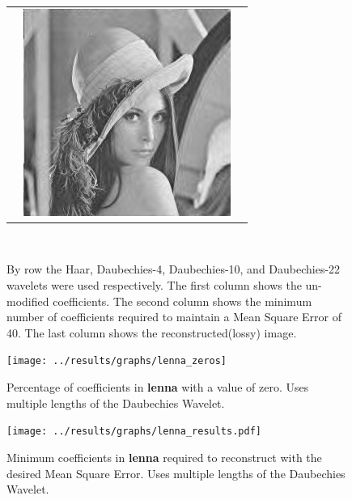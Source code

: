\begin{figure}[hbt]
\begin{tabular}{ S @{} S @{} S }
		&	\includegraphics[height=0.25\textwidth]{../images/lenna_d22_final} \\
	\end{tabular} \\
	\caption{By row the Haar, Daubechies-4, Daubechies-10, and Daubechies-22 wavelets were used 
					 respectively. The first
					 column shows the un-modified coefficients.  The second column shows the minimum number
					 of coefficients required to maintain a Mean Square Error of 40.
					 The last column shows the reconstructed(lossy) image.}
\end{figure}

\vfill

\begin{figure}[hbt]
	\centering
	\label{fig:lenna_zeros}
		\texttt{[image: ../results/graphs/lenna\_zeros]}
	\caption{Percentage of coefficients in {\bf lenna} with a value of zero. Uses multiple lengths of the Daubechies Wavelet. }
\end{figure}
\begin{figure}[hbt]
	\centering
	\label{fig:lenna_stats}
		\texttt{[image: ../results/graphs/lenna\_results.pdf]}
	\caption{Minimum coefficients in {\bf lenna} required to reconstruct with the desired Mean Square Error. Uses multiple lengths of the Daubechies Wavelet. }
\end{figure}





